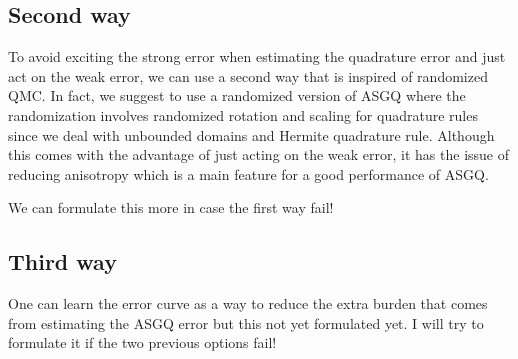 \subsection{Second way}
To avoid exciting the strong error when estimating the quadrature error and just act on the weak error, we can use a second way that is inspired of randomized QMC. In fact, we suggest to use a randomized version of ASGQ where the randomization involves randomized rotation and scaling for quadrature rules since we deal with unbounded domains and Hermite quadrature rule. Although this comes with the advantage of just acting on the weak error, it has the issue of reducing anisotropy which is a main feature for a good performance of ASGQ.

We can formulate this more in case the first way fail!

\subsection{Third way}
One can learn the error curve as a way to reduce the extra burden that comes
from estimating the ASGQ error but this not yet formulated yet. I will try to formulate it if the two previous options fail!